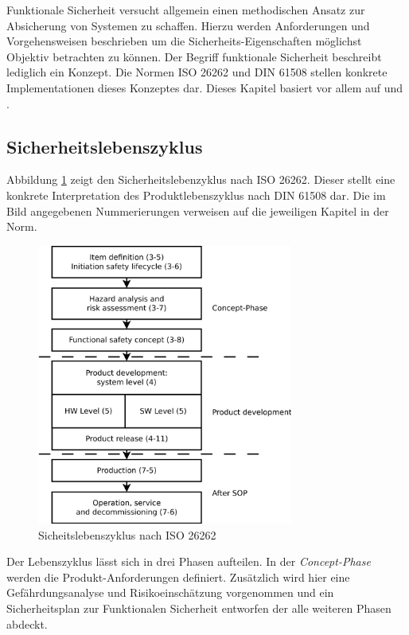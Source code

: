 \documentclass[
  a4paper,					    %
  twoside,
  DIV=calc,     				%
  bibliography=totoc,
  cleardoublepage=empty,
  ngerman,     					%
  final       					%
]{scrbook}
\begin{document}
Funktionale Sicherheit versucht allgemein einen methodischen Ansatz zur Absicherung von Systemen zu schaffen. Hierzu werden Anforderungen und Vorgehensweisen beschrieben um die Sicherheits-Eigenschaften möglichst Objektiv betrachten zu können. Der Begriff funktionale Sicherheit beschreibt lediglich ein Konzept. Die Normen ISO 26262 und DIN 61508 stellen konkrete Implementationen dieses Konzeptes dar. Dieses Kapitel basiert vor allem auf \cite{iso26262} und \cite{iso26262_robuste}.

\subsection{Sicherheitslebenszyklus}
\label{sec:ISO26262_lebenszyklus}

Abbildung \ref{fig:lifecycle} zeigt den Sicherheitslebenzyklus nach ISO 26262. Dieser stellt eine konkrete Interpretation des Produktlebenszyklus nach DIN 61508 dar. Die im Bild angegebenen Nummerierungen verweisen auf die jeweiligen Kapitel in der Norm. 

\begin{figure}[!htbp]
\center
\includegraphics[width=0.75\textwidth]{ISO_26262_Lifecycle}
\caption{Sicheitslebenszyklus nach ISO 26262\cite{iso26262}}
\label{fig:lifecycle}
\end{figure}

Der Lebenszyklus lässt sich in drei Phasen aufteilen. In der \emph{Concept-Phase} werden die Produkt-Anforderungen definiert. Zusätzlich wird hier eine Gefährdungsanalyse und Risikoeinschätzung vorgenommen und ein Sicherheitsplan zur Funktionalen Sicherheit entworfen der alle weiteren Phasen abdeckt.
\end{document}
